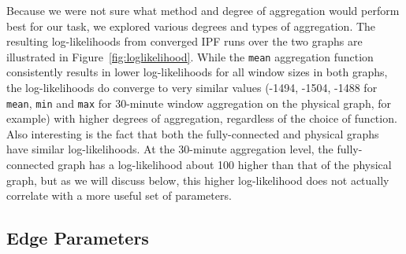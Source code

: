 Because we were not sure what method and degree of aggregation would perform best for our task, we explored various degrees and types of aggregation.
The resulting log-likelihoods from converged IPF runs over the two graphs are illustrated in Figure~\ref{fig:loglikelihood}.
While the \texttt{mean} aggregation function consistently results in lower log-likelihoods for all window sizes in both graphs, the log-likelihoods do converge to very similar values (-1494, -1504, -1488 for \texttt{mean}, \texttt{min} and \texttt{max} for 30-minute window aggregation on the physical graph, for example) with higher degrees of aggregation, regardless of the choice of function.
Also interesting is the fact that both the fully-connected and physical graphs have similar log-likelihoods.
At the 30-minute aggregation level, the fully-connected graph has a log-likelihood about 100 higher than that of the physical graph, but as we will discuss below, this higher log-likelihood does not actually correlate with a more useful set of parameters.

\subsection{Edge Parameters}





